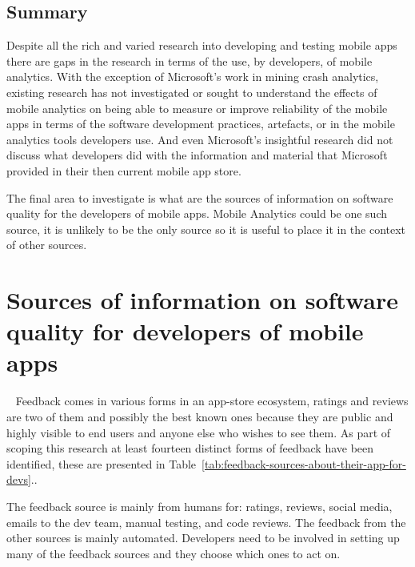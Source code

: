 \subsection{Summary} 
Despite all the rich and varied research into developing and testing mobile apps there are gaps in the research in terms of the use, by developers, of mobile analytics. With the exception of Microsoft's work in mining crash analytics, existing research has not investigated or sought to understand the effects of mobile analytics on being able to measure or improve reliability of the mobile apps in terms of the software development practices, artefacts, or in the mobile analytics tools developers use. And even Microsoft's insightful research did not discuss what developers did with the information and material that Microsoft provided in their then current mobile app store. 

The final area to investigate is what are the sources of information on software quality for the developers of mobile apps. Mobile Analytics could be one such source, it is unlikely to be the only source so it is useful to place it in the context of other sources.


\section{Sources of information on software quality for developers of mobile apps}~\label{rw-sources-of-info-on-software-quality-for-devs-of-mobile-apps}
Feedback comes in various forms in an app-store ecosystem, ratings and reviews are two of them and possibly the best known ones because they are public and highly visible to end users and anyone else who wishes to see them. As part of scoping this research at least fourteen distinct forms of feedback have been identified, these are presented in Table~\ref{tab:feedback-sources-about-their-app-for-devs}..

The feedback source is mainly from humans for: ratings, reviews, social media, emails to the dev team, manual testing, and code reviews. The feedback from the other sources is mainly automated. Developers need to be involved in setting up many of the feedback sources and they choose which ones to act on.

